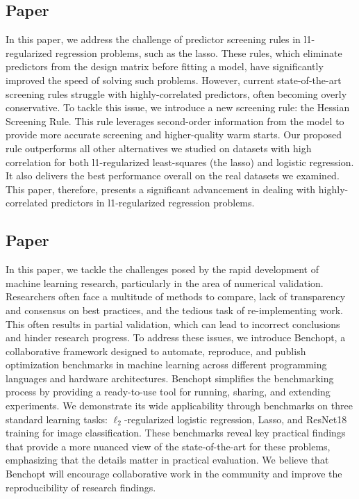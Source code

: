 \documentclass{book}
\begin{document}
\subsection{Paper \III}

In this paper, we address the challenge of predictor screening rules in l1-regularized regression problems, such as the lasso. These rules, which eliminate predictors from the design matrix before fitting a model, have significantly improved the speed of solving such problems. However, current state-of-the-art screening rules struggle with highly-correlated predictors, often becoming overly conservative. To tackle this issue, we introduce a new screening rule: the Hessian Screening Rule. This rule leverages second-order information from the model to provide more accurate screening and higher-quality warm starts. Our proposed rule outperforms all other alternatives we studied on datasets with high correlation for both l1-regularized least-squares (the lasso) and logistic regression. It also delivers the best performance overall on the real datasets we examined. This paper, therefore, presents a significant advancement in dealing with highly-correlated predictors in l1-regularized regression problems.

\subsection{Paper \IV}

In this paper, we tackle the challenges posed by the rapid development of machine learning research, particularly in the area of numerical validation. Researchers often face a multitude of methods to compare, lack of transparency and consensus on best practices, and the tedious task of re-implementing work. This often results in partial validation, which can lead to incorrect conclusions and hinder research progress. To address these issues, we introduce Benchopt, a collaborative framework designed to automate, reproduce, and publish optimization benchmarks in machine learning across different programming languages and hardware architectures. Benchopt simplifies the benchmarking process by providing a ready-to-use tool for running, sharing, and extending experiments. We demonstrate its wide applicability through benchmarks on three standard learning tasks: $\ell_2$-regularized logistic regression, Lasso, and ResNet18 training for image classification. These benchmarks reveal key practical findings that provide a more nuanced view of the state-of-the-art for these problems, emphasizing that the details matter in practical evaluation. We believe that Benchopt will encourage collaborative work in the community and improve the reproducibility of research findings.
\end{document}
